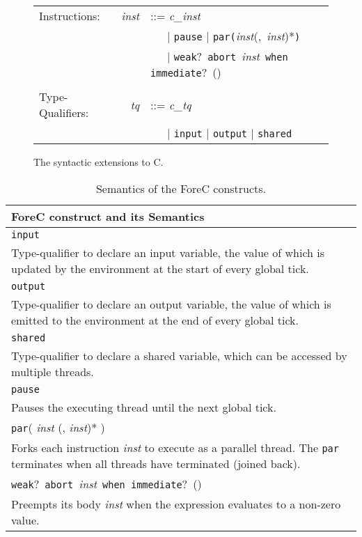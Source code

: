 \begin{figure}[t]
	\centering

	\renewcommand{\arraystretch}{1.25}
	\begin{tabular}{l r l}
		Instructions:		& \emph{inst} & ::= \emph{c\_inst}																\\
							&			& ~~~| \verb$pause$ | \verb$par($\emph{inst}(,~\emph{inst})*\verb$)$				\\
							&			& ~~~| \verb$weak$?~\verb$abort$~\emph{inst}~\verb$when immediate$?~(\expression{})	\\
																															\\
		Type-Qualifiers:	& \emph{tq}	& ::= \emph{c\_tq}																	\\
							&			& ~~~| \verb$input$ | \verb$output$ | \verb$shared$
	\end{tabular}
	
	\caption{The syntactic extensions to C.}
	\label{fig:forec_syntax}
\end{figure}

\begin{table}[t]
	\centering
	\renewcommand{\arraystretch}{1.25}		

	\begin{tabular}{| p{\textwidth} |}
		\hline
		\textbf{ForeC construct and its Semantics}										\\ 
		\hline
		
		\verb$input$																	\\
			Type-qualifier to declare an input variable, the value of which is updated 
			by the environment at the start of every global tick.						\\ \hline
		\verb$output$																	\\
			Type-qualifier to declare an output variable, the value of which is emitted 
			to the environment at the end of every global tick.							\\ \hline
		\verb$shared$																	\\
			Type-qualifier to declare a shared variable, which can be accessed by 
			multiple threads.															\\ \hline
		\verb$pause$																	\\
			Pauses the executing thread until the next global tick.						\\ \hline
		\verb$par$( \emph{inst} (, \emph{inst})* )										\\
			Forks each instruction \emph{inst} to execute as a parallel thread. The 
			\verb$par$ terminates when all threads have terminated (joined back).		\\ \hline
		\verb$weak$?~\verb$abort$~\emph{inst}~\verb$when immediate$?~(\expression{})	\\
			Preempts its body \emph{inst} when the expression \expression{} evaluates to 
			a non-zero value.															\\
		\hline
	\end{tabular}

	\caption{Semantics of the ForeC constructs.}
	\label{table:forec_semantics}
\end{table}


